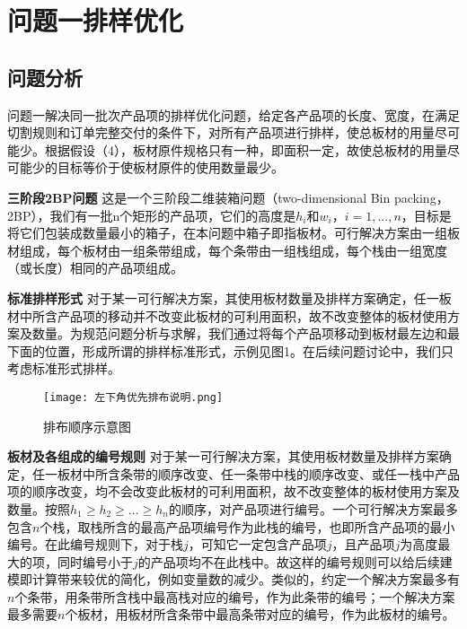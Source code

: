 \documentclass[bwprint]{gmcmthesis}
\begin{document}
\section{问题一排样优化}

\subsection{问题分析}

问题一解决同一批次产品项的排样优化问题，给定各产品项的长度、宽度，在满足切割规则和订单完整交付的条件下，对所有产品项进行排样，使总板材的用量尽可能少。根据假设（4），板材原件规格只有一种，即面积一定，故使总板材的用量尽可能少的目标等价于使板材原件的使用数量最少。

\textbf{三阶段2BP问题} \quad 这是一个三阶段二维装箱问题（two-dimensional  {\rm Bin} packing，2BP），我们有一批n个矩形的产品项，它们的高度是$h_i$和$w_i$，$i=1,...,n$，目标是将它们包装成数量最小的箱子，在本问题中箱子即指板材。可行解决方案由一组板材组成，每个板材由一组条带组成，每个条带由一组栈组成，每个栈由一组宽度（或长度）相同的产品项组成。

\textbf{标准排样形式} \quad 对于某一可行解决方案，其使用板材数量及排样方案确定，任一板材中所含产品项的移动并不改变此板材的可利用面积，故不改变整体的板材使用方案及数量。为规范问题分析与求解，我们通过将每个产品项移动到板材最左边和最下面的位置，形成所谓的排样标准形式，示例见图1。在后续问题讨论中，我们只考虑标准形式排样。

\begin{figure}[!htbp]
    \centering
        \texttt{[image: 左下角优先排布说明.png]}
        \caption{排布顺序示意图} \label{左下角优先排布说明}
\end{figure}


\textbf{板材及各组成的编号规则} \quad 对于某一可行解决方案，其使用板材数量及排样方案确定，任一板材中所含条带的顺序改变、任一条带中栈的顺序改变、或任一栈中产品项的顺序改变，均不会改变此板材的可利用面积，故不改变整体的板材使用方案及数量。按照$h_1 \geq h_2 \geq ...\geq h_n$的顺序，对产品项进行编号。一个可行解决方案最多包含$n$个栈，取栈所含的最高产品项编号作为此栈的编号，也即所含产品项的最小编号。在此编号规则下，对于栈$j$，可知它一定包含产品项$j$，且产品项$j$为高度最大的项，同时编号小于$j$的产品项均不在此栈中。故这样的编号规则可以给后续建模即计算带来较优的简化，例如变量数的减少。类似的，约定一个解决方案最多有$n$个条带，用条带所含栈中最高栈对应的编号，作为此条带的编号；一个解决方案最多需要$n$个板材，用板材所含条带中最高条带对应的编号，作为此板材的编号。
\end{document}
